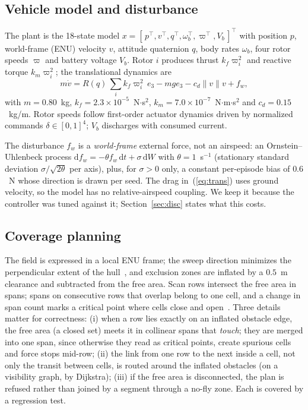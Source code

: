 \documentclass[\PAPERCLASSOPT]{IEEEtran}
\begin{document}
\subsection{Vehicle model and disturbance}

The plant is the 18-state model
$x = [\,p^\top, v^\top, q^\top, \omega_b^\top, \varpi^\top, V_b\,]^\top$
with position $p$, world-frame (ENU) velocity $v$, attitude quaternion $q$, body
rates $\omega_b$, four rotor speeds $\varpi$ and battery voltage $V_b$. Rotor
$i$ produces thrust $k_f\varpi_i^2$ and reactive torque $k_m\varpi_i^2$; the
translational dynamics are
\begin{equation}
  m\dot v = R(q)\,\textstyle\sum_i k_f \varpi_i^2 \,e_3 - m g e_3
            - c_d \lVert v \rVert v + f_w ,
  \label{eq:trans}
\end{equation}
with $m=0.80$~kg, $k_f=2.3\times10^{-5}$~N$\cdot$s$^2$,
$k_m=7.0\times10^{-7}$~N$\cdot$m$\cdot$s$^2$ and $c_d=0.15$~kg/m. Rotor speeds
follow first-order actuator dynamics driven by normalized commands
$\delta\in[0,1]^4$; $V_b$ discharges with consumed current.

The disturbance $f_w$ is a \emph{world-frame} external force, not an airspeed:
an Ornstein--Uhlenbeck process
$\mathrm{d}f_w = -\theta f_w\,\mathrm{d}t + \sigma\,\mathrm{d}W$ with
$\theta=1$~s$^{-1}$ (stationary standard deviation $\sigma/\sqrt{2\theta}$ per
axis), plus, for $\sigma>0$ only, a constant per-episode bias of $0.6$~N whose
direction is drawn per seed. The drag in~(\ref{eq:trans}) uses ground velocity,
so the model has no relative-airspeed coupling. We keep it because the
controller was tuned against it; Section~\ref{sec:disc} states what this costs.

\subsection{Coverage planning}

The field is expressed in a local ENU frame; the sweep direction minimizes the
perpendicular extent of the hull~\cite{huang2001optimal}, and exclusion zones are
inflated by a $0.5$~m clearance and subtracted from the free area. Scan rows
intersect the free area in spans; spans on consecutive rows that overlap belong
to one cell, and a change in span count marks a critical point where cells close
and open~\cite{choset1998boustrophedon}. Three details matter for correctness:
(i) when a row lies exactly on an inflated obstacle edge, the free area (a
closed set) meets it in collinear spans that \emph{touch}; they are merged into
one span, since otherwise they read as critical points, create spurious cells
and force stops mid-row;
(ii) the link from one row to the next inside a cell, not only the transit
between cells, is routed around the inflated obstacles (on a visibility graph,
by Dijkstra);
(iii) if the free area is disconnected, the plan is refused rather than joined
by a segment through a no-fly zone. Each is covered by a regression test.
\end{document}
